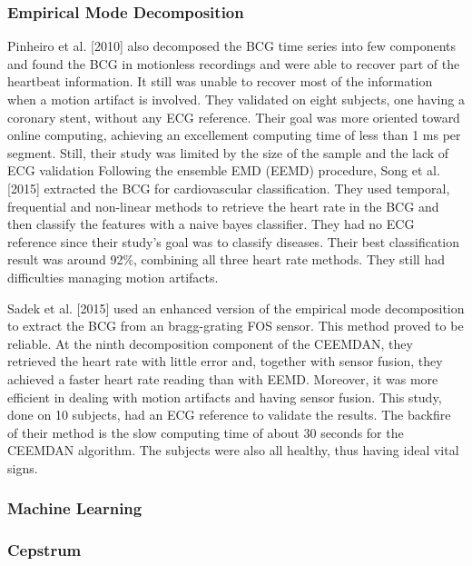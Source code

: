 \documentclass[twoside,onecolumn]{article}
\begin{document}
\subsubsection{Empirical Mode Decomposition}
Pinheiro et al. [2010] also decomposed the BCG time series into few components and found the BCG in motionless recordings and were able to recover part of the heartbeat information. It still was unable to recover most of the information when a motion artifact is involved. They validated on eight subjects, one having a coronary stent, without any ECG reference. Their goal was more oriented toward online computing, achieving an excellement computing time of less than 1 ms per segment. Still, their study was limited by the size of the sample and the lack of ECG validation
Following the ensemble EMD (EEMD) procedure, Song et al.[2015] extracted the BCG for cardiovascular classification. They used temporal, frequential and non-linear methods to retrieve the heart rate in the BCG and then classify the features with a naive bayes classifier. They had no ECG reference since their study's goal was to classify diseases. Their best classification result was around 92\%, combining all three heart rate methods. They still had difficulties managing motion artifacts.

Sadek et al. [2015] used an enhanced version of the empirical mode decomposition to extract the BCG from an bragg-grating FOS sensor. This method proved to be reliable. At the ninth decomposition component of the CEEMDAN, they retrieved the heart rate with little error and, together with sensor fusion, they achieved a faster heart rate reading than with EEMD. Moreover, it was more efficient in dealing with motion artifacts and having sensor fusion. This study, done on 10 subjects, had an ECG reference to validate the results. The backfire of their method is the slow computing time of about 30 seconds for the CEEMDAN algorithm. The subjects were also all healthy, thus having ideal vital signs.


\subsubsection{Machine Learning}

\subsubsection{Cepstrum}
\newpage



 
\end{document}
